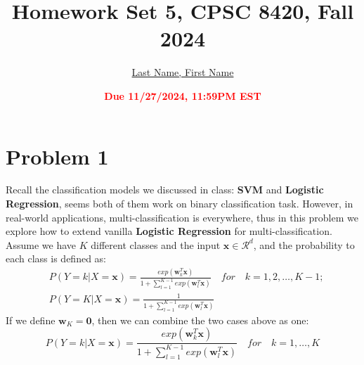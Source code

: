 \documentclass[11pt]{article}
\title{{\bf Homework Set 5, CPSC 8420, Fall 2024}} %
\author{\Large\underline{Last Name, First Name}}
\date{\textbf{\Large\textcolor{red}{Due 11/27/2024, 11:59PM EST}}} %
\newcommand{\vct}[1]{\mathbf{#1}}
\def \vzero    {\vct{0}}
\def \vw {\vct{w}}
\def \vx {\vct{x}}
\begin{document}
\maketitle
\section*{Problem 1}
Recall the classification models we discussed in class: \textbf{SVM} and \textbf{Logistic Regression}, seems both of them work on binary classification task. However, in real-world applications, multi-classification is everywhere, thus in this problem we explore how to extend vanilla \textbf{Logistic Regression} for multi-classification. Assume we have $K$ different classes and the input $
\vx\in\mathcal{R}^d$, and the probability to each class is defined as:
\begin{equation}
	\begin{aligned}
		&P(Y=k|X=\vx) =  \frac{exp(\vw_k^T\vx)}{ 1+\sum_{l=1}^{K-1}exp(\vw_l^T\vx)} \quad for  \quad k=1,2,\dots,K-1;\\&P(Y=K|X=\vx) =  \frac{1} { 1+\sum_{l=1}^{K-1}exp(\vw_l^T\vx)}
	\end{aligned}
\end{equation}
If we define $\vw_K=\vzero$, then we can combine the two cases above as one:
\begin{equation}
	P(Y=k|X=\vx) =  \frac{exp(\vw_k^T\vx)}{ 1+\sum_{l=1}^{K-1}exp(\vw_l^T\vx)} \quad for  \quad k=1,\dots,K
\end{equation}
\end{document}
